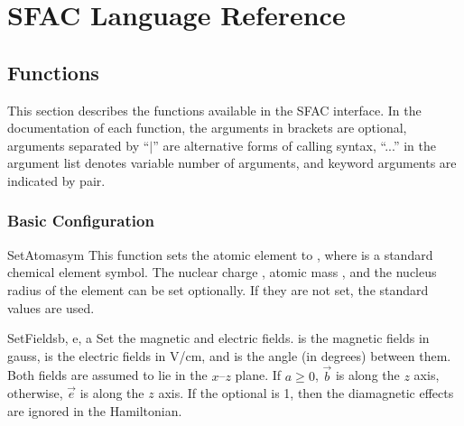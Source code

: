 \chapter{SFAC Language Reference}
\label{cha:function}

\section{Functions}
\label{sec:fac}

This section describes the functions available in the SFAC interface. In the
documentation of each function, the arguments in brackets are optional,
arguments separated by ``$\mid$'' are alternative forms of calling syntax,
``...'' in the argument list denotes variable number of arguments, and keyword
arguments are indicated by  pair.

\subsection{Basic Configuration}

\begin{fundesc}{SetAtom}{asym}
This function sets the atomic element to , where  is a
standard chemical element symbol. The nuclear charge , atomic mass
, and the nucleus radius of the element can be set optionally. If they
are not set, the standard values are used.
\end{fundesc}

\begin{fundesc}{SetFields}{b, e, a}
Set the magnetic and electric fields.  is the magnetic fields in gauss,
 is the electric fields in V/cm, and  is the angle (in degrees)
between them. Both fields are assumed to lie in the $x$--$z$ plane. If $a \ge
0$, $\vec{b}$ is along the $z$ axis, otherwise, $\vec{e}$ is along the $z$ axis.
If the optional  is 1, then the diamagnetic effects are ignored in the
Hamiltonian.
\end{fundesc}

